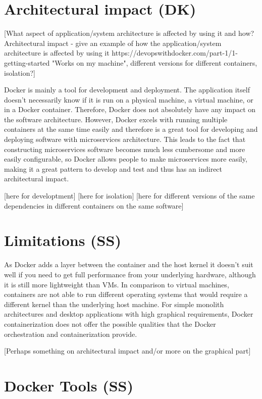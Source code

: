 \documentclass[fleqn,12pt]{olplainarticle}
\begin{document}
\section{Architectural impact (DK)}

[What aspect of application/system architecture is affected by using it and how?
Architectural impact - give an example of how the application/system architecture is affected by using it
https://devopswithdocker.com/part-1/1-getting-started
"Works on my machine", different versions for different containers, isolation?]

Docker is mainly a tool for development and deployment. The application itself doesn't necessarily know if it is run on a physical machine, a virtual machine, or in a Docker container. Therefore, Docker does not absolutely have any impact on the software architecture. However, Docker excels with running multiple containers at the same time easily and therefore is a great tool for developing and deploying software with microservices architecture. This leads to the fact
that constructing microservices software becomes much less cumbersome and more easily configurable, so Docker allows people to make microservices more easily, making it a great pattern to develop and test and thus has an indirect architectural impact.

[here for developtment]
[here for isolation]
[here for different versions of the same dependencies in different containers on the same software]

\section{Limitations (SS)}

As Docker adds a layer between the container and the host kernel it doesn't suit well if you need to get full performance from your underlying hardware, although it is still more lightweight than VMs\citep{cloudsavvy:not_to_use}. In comparison to virtual machines, containers are not able to run different operating systems that would require a different kernel than the underlying host machine. For simple monolith architectures and desktop applications with high graphical requirements, Docker containerization does not offer the possible qualities that the Docker orchestration and containerization provide.

[Perhaps something on architectural impact and/or more on the graphical part]

\section{Docker Tools (SS)}
\end{document}
